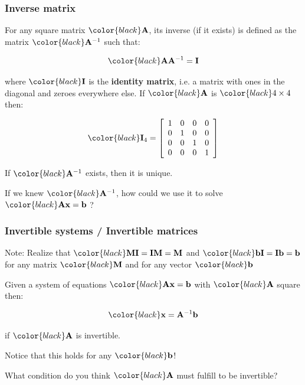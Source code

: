 \documentclass[compress]{beamer}
\newcommand{\black}[1]{{\color{black}#1}}
\renewcommand{\emph}[1]{\textbf{\black{#1}}}
\newcommand{\beq}[1]{\[\black{#1}\]}
\begin{document}
\begin{frame}
\frametitle{Inverse matrix}


For any square matrix $\black{\A}$, its inverse (if it exists) is defined as the matrix $\black{\A^{-1}}$ such that:

\beq{
\A\A^{-1}=\I
}

where $\black{\I}$ is the \emph{identity matrix}, i.e. a matrix with ones in the diagonal and zeroes everywhere else. If $\black{\A}$ is $\black{4\times 4}$ then:

\beq{
\I_{4} = \left[
\begin{array}{cccc}
1 & 0 & 0 & 0\\
0 & 1 & 0 & 0\\
0 & 0 & 1 & 0\\
0 & 0 & 0 & 1
\end{array}
\right]
}

\vspace{.5cm}
If $\black{\A^{-1}}$ exists, then it is unique.

\vspace{.5cm}
If we knew $\black{\A^{-1}}$, how could we use it to solve $\black{\A\x=\b}$ ?

\end{frame}



\begin{frame}
\frametitle{Invertible systems / Invertible matrices}

\tiny{\black{Note:} Realize that $\black{\M\I=\I\M=\M}$ and $\black{\b\I=\I\b=\b}$ for any matrix $\black{\M}$ and for any vector $\black{\b}$}

\vspace{.5cm}

\small

Given a system of equations $\black{\A\x=\b}$ with $\black{\A}$ square then: 

\beq{
\x = \A^{-1}\b
}

if $\black{\A}$ is invertible. 

\vspace{.5cm}
Notice that this holds for any $\black{\b}$!

\vspace{.5cm}
What condition do you think $\black{\A}$ must fulfill to be invertible?

\end{frame}

\end{document}
